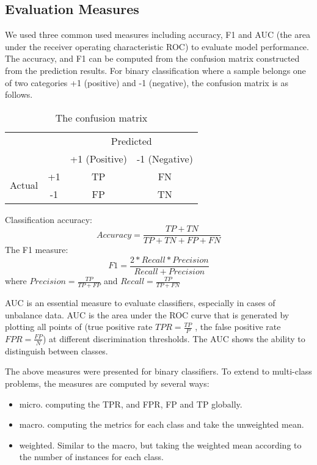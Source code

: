 \subsection {Evaluation Measures}
We used three common used measures including accuracy, F1 and AUC (the area under the receiver operating characteristic \- ROC) to evaluate model performance. The accuracy, and F1 can be computed from the confusion matrix constructed from the prediction results. For binary classification where a sample belongs one of two categories +1 (positive) and -1 (negative), the confusion matrix is as follows.
\begin{table}[]
\begin{center}
\caption{The confusion matrix}
\begin{tabular}{llcc}
\hline
 & & \multicolumn{2}{c}{Predicted} \\ \cline{3-4} 
 &  & +1 (Positive) & -1 (Negative) \\ \hline
\multirow{2}{*}{Actual} & \multicolumn{1}{c}{+1} & TP & FN  \\
                        & \multicolumn{1}{c}{-1} & FP & TN  \\ \hline
\end{tabular}
\end{center}
\end{table}

Classification accuracy:
\begin{equation}
    Accuracy = \frac{TP + TN}{TP + TN + FP + FN}
\end{equation}
The F1 measure:
\begin{equation}
    F1 = \frac{2* Recall * Precision}{Recall + Precision}
\end{equation}
where $Precision = \frac{TP}{TP + FP}$ and $Recall = \frac{TP}{TP + FN}$

AUC is an essential measure to evaluate classifiers, especially in cases of unbalance data. AUC is the area under the ROC curve that is generated by plotting all points of (true positive rate $TPR = \frac{TP}{P}$ , the false positive rate $FPR = \frac{FP}{N}$) at different discrimination thresholds. The AUC shows the ability to distinguish between classes.

The above measures were presented for binary classifiers. To extend to multi-class problems, the measures are computed by several ways:
\begin{itemize}
    \item micro. computing the TPR, and FPR, FP and TP globally.
    \item macro. computing the metrics for each class and take the unweighted mean.
    \item weighted. Similar to the macro, but taking the weighted mean according to the number of instances for each class. 
\end{itemize}{}
